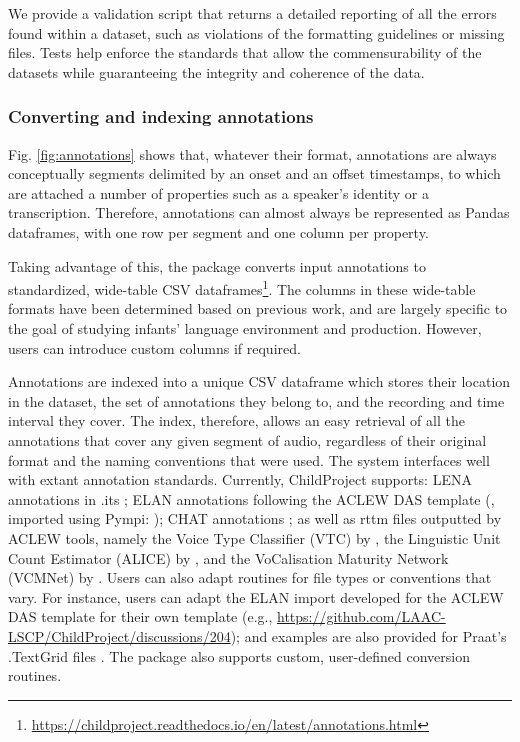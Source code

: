 \documentclass[smallextended]{svjour3}       %
\begin{document}
We provide a validation script that returns a detailed reporting of all the errors found within a dataset, such as violations of the formatting guidelines or missing files. Tests help enforce the standards that allow the commensurability of the datasets while guaranteeing the integrity and coherence of the data.

\subsubsection*{Converting and indexing annotations}\label{section:annotations}

Fig. \ref{fig:annotations} shows that, whatever their format, annotations are always conceptually segments delimited by an onset and an offset timestamps, to which are attached a number of properties such as a speaker's identity or a transcription. Therefore, annotations can almost always be represented as Pandas dataframes, with one row per segment and one column per property.

Taking advantage of this, the package converts input annotations to standardized, wide-table CSV dataframes\footnote{\url{https://childproject.readthedocs.io/en/latest/annotations.html}}. The columns in these wide-table formats have been determined based on previous work, and are largely specific to the goal of studying infants' language environment and production. However, users can introduce custom columns if required.

Annotations are indexed into a unique CSV dataframe which stores their location in the dataset, the set of annotations they belong to, and the recording and time interval they cover. The index, therefore, allows an easy retrieval of all the annotations that cover any given segment of audio, regardless of their original format and the naming conventions that were used. The system interfaces well with extant annotation standards. Currently, ChildProject supports: LENA annotations in .its \citep{xu2008lenatm}; ELAN annotations following the ACLEW DAS template  (\citealt{Casillas2017}, imported using Pympi: \citealt{pympi-1.70}); CHAT annotations \citep{MacWhinney2000}; as well as rttm files outputted by ACLEW tools, namely the Voice Type Classifier (VTC) by \citet{lavechin2020opensource}, the Linguistic Unit Count Estimator (ALICE) by \citet{rasanen2020}, and the VoCalisation Maturity Network (VCMNet) by \citet{AlFutaisi2019}. Users can also adapt routines for file types or conventions that vary. For instance, users can adapt the ELAN import developed for the ACLEW DAS template for their own template (e.g., \url{https://github.com/LAAC-LSCP/ChildProject/discussions/204}); and examples are also provided for Praat's .TextGrid files \citep{boersma2006praat}. The package also supports custom, user-defined conversion routines.
\end{document}
